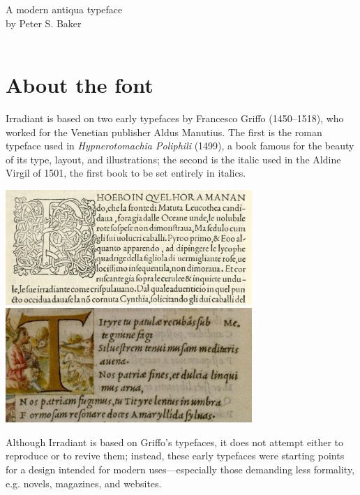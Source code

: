 \documentclass[12pt]{book}
\begin{document}
\begin{titlepage}
\hrulefill\\
\Huge {} \\[1cm]
\huge \centering A modern antiqua typeface \\[1cm]
\large \centering by {Peter S. Baker}\\[1cm]
\huge{} \\
\hrulefill
\end{titlepage}
\cleardoublepage

\section*{About the font}

Irradiant is based on two early typefaces by Francesco Griffo
(1450–1518), who worked for the Venetian publisher Aldus Manutius. The
first is the roman typeface used in \textit{Hypnerotomachia Poliphili}
(1499), a book famous for the beauty of its type, layout, and
illustrations; the second is the italic used in the Aldine Virgil of
1501, the first book to be set entirely in italics.

\begin{center}
\includegraphics[width=0.7\textwidth]{hypnerotomachia_sample}\\[1ex]

\includegraphics[width=0.7\textwidth]{Virgil_sample}
\end{center}

Although Irradiant is based on Griffo's typefaces, it does not attempt
either to reproduce or to revive them; instead, these early typefaces
were starting points for a design intended for modern
uses---especially those demanding less formality, e.g. novels, magazines, and
websites.
\end{document}
